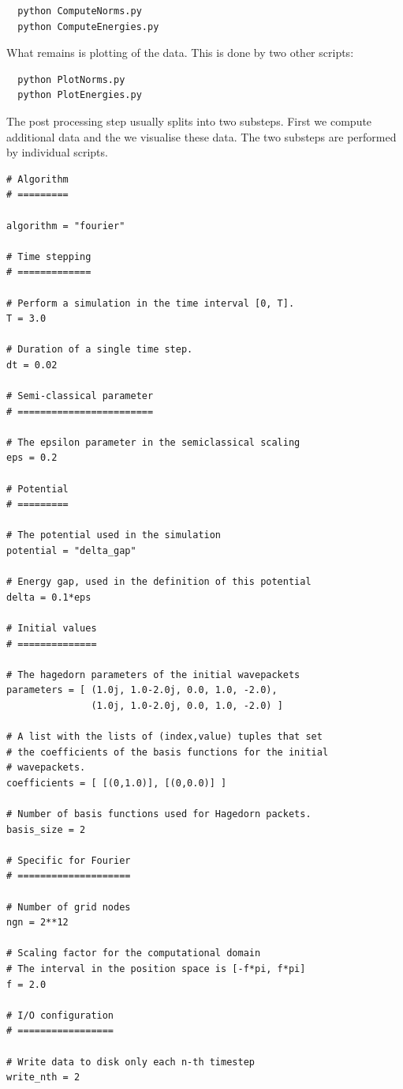 \documentclass[a4paper,10pt]{report}
\begin{document}
\begin{verbatim}
  python ComputeNorms.py
  python ComputeEnergies.py
\end{verbatim}

What remains is plotting of the data. This is done by two other scripts:

\begin{verbatim}
  python PlotNorms.py
  python PlotEnergies.py
\end{verbatim}

The post processing step usually splits into two substeps. First we compute additional
data and the we visualise these data. The two substeps are performed by individual
scripts.

% 
\begin{lstlisting}[float=tp,frame=single,label=lstparameters01,caption={Sample configuration \texttt{parameters\_01.py}}]
# Algorithm
# =========

algorithm = "fourier"

# Time stepping
# =============

# Perform a simulation in the time interval [0, T].
T = 3.0

# Duration of a single time step.
dt = 0.02

# Semi-classical parameter
# ========================

# The epsilon parameter in the semiclassical scaling
eps = 0.2

# Potential
# =========

# The potential used in the simulation
potential = "delta_gap"

# Energy gap, used in the definition of this potential
delta = 0.1*eps

# Initial values
# ==============

# The hagedorn parameters of the initial wavepackets
parameters = [ (1.0j, 1.0-2.0j, 0.0, 1.0, -2.0),
               (1.0j, 1.0-2.0j, 0.0, 1.0, -2.0) ]

# A list with the lists of (index,value) tuples that set
# the coefficients of the basis functions for the initial
# wavepackets.
coefficients = [ [(0,1.0)], [(0,0.0)] ]

# Number of basis functions used for Hagedorn packets.
basis_size = 2

# Specific for Fourier
# ====================

# Number of grid nodes
ngn = 2**12

# Scaling factor for the computational domain
# The interval in the position space is [-f*pi, f*pi]
f = 2.0

# I/O configuration
# =================

# Write data to disk only each n-th timestep
write_nth = 2
\end{lstlisting}
\end{document}
